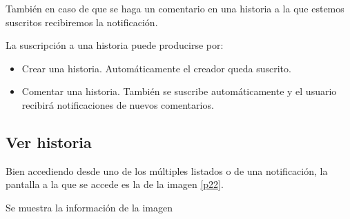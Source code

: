 \documentclass[11pt,a4paper, titlepage]{article}
\begin{document}
	También en caso de que se haga un comentario en una historia a la que estemos suscritos recibiremos la notificación.
	
	La suscripción a una historia puede producirse por:
	\begin{itemize}
		\item Crear una historia. Automáticamente el creador queda suscrito.
		\item Comentar una historia. También se suscribe automáticamente y el usuario recibirá notificaciones de nuevos comentarios.
	\end{itemize}
	
	\FloatBarrier
	
	\newpage
	\subsection{Ver historia}
	
	Bien accediendo desde uno de los múltiples listados o de una notificación, la pantalla a la que se accede es la de la imagen \ref{p22}.
	
	Se muestra la información de la imagen
	
\end{document}
